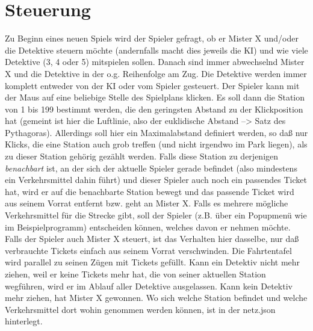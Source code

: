     \section{Steuerung}
        Zu Beginn eines neuen Spiels wird der Spieler gefragt, ob er Mister X und/oder die Detektive steuern möchte (andernfalls macht dies jeweils die KI) und wie viele Detektive (3, 4 oder 5) mitspielen sollen.
        Danach sind immer abwechselnd Mister X und die Detektive in der o.g. Reihenfolge am Zug.
        Die Detektive werden immer komplett entweder von der KI oder vom Spieler gesteuert.
        \newline
        \newline
        Der Spieler kann mit der Maus auf eine beliebige Stelle des Spielplans klicken.
        Es soll dann die Station von 1 bis 199 bestimmt werden, die den geringsten Abstand zu der Klickposition hat (gemeint ist hier die Luftlinie, also der euklidische Abstand --> Satz des Pythagoras).
        Allerdings soll hier ein Maximalabstand definiert werden, so daß nur Klicks, die eine Station auch grob treffen (und nicht irgendwo im Park liegen), als zu dieser Station gehörig gezählt werden.
        Falls diese Station zu derjenigen \textit{benachbart} ist, an der sich der aktuelle Spieler gerade befindet (also mindestens ein Verkehrsmittel dahin führt) und dieser Spieler auch noch ein passendes Ticket hat, wird er auf die benachbarte Station bewegt und das passende Ticket wird aus seinem Vorrat entfernt bzw. geht an Mister X.
        Falls es mehrere mögliche Verkehrsmittel für die Strecke gibt, soll der Spieler (z.B. über ein Popupmenü wie im Beispielprogramm) entscheiden können, welches davon er nehmen möchte.
        \newline
        \newline
        Falls der Spieler auch Mister X steuert, ist das Verhalten hier dasselbe, nur daß verbrauchte Tickets einfach aus seinem Vorrat verschwinden.
        Die Fahrtentafel wird parallel zu seinen Zügen mit Tickets gefüllt.
        \newline
        \newline
        Kann ein Detektiv nicht mehr ziehen, weil er keine Tickets mehr hat, die von seiner aktuellen Station wegführen, wird er im Ablauf aller Detektive ausgelassen.
        Kann kein Detektiv mehr ziehen, hat Mister X gewonnen.
        \newline
        \newline
        Wo sich welche Station befindet und welche Verkehrsmittel dort wohin genommen werden können, ist in der netz.json hinterlegt.

